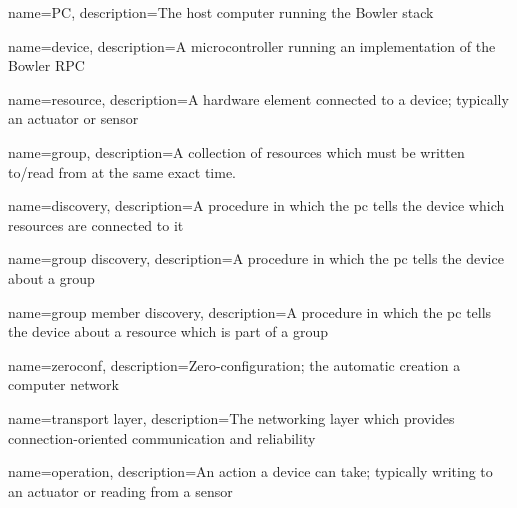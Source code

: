{
    name=PC,
    description={The host computer running the Bowler stack}
}

{
    name=device,
    description={A microcontroller running an implementation of the Bowler RPC}
}

{
    name=resource,
    description={A hardware element connected to a \Gls{device}; typically an actuator or sensor}
}

{
    name=group,
    description={A collection of \Glspl{resource} which must be written to/read from at the same
    exact time.}
}

{
    name=discovery,
    description={A procedure in which the \Gls{pc} tells the \Gls{device} which \Glspl{resource} are
    connected to it}
}

{
    name=group discovery,
    description={A procedure in which the \Gls{pc} tells the \Gls{device} about a \Gls{group}}
}

{
    name=group member discovery,
    description={A procedure in which the \Gls{pc} tells the \Gls{device} about a
    \Gls{resource} which is part of a \Gls{group}}
}

{
    name=zeroconf,
    description={Zero-configuration; the automatic creation a computer network}
}

{
    name=transport layer,
    description={The networking layer which provides connection-oriented communication and reliability}
}

{
    name=operation,
    description={An action a \gls{device} can take; typically writing to an actuator or reading from
    a sensor}
}


